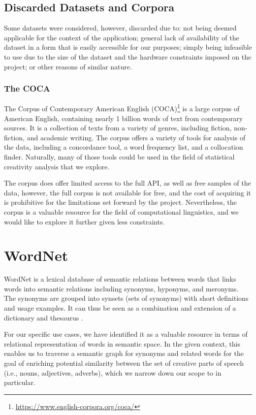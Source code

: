 
\subsection{Discarded Datasets and Corpora}
Some datasets were considered, however, discarded due to: not being deemed applicable for the context of the application; general lack of availability of the dataset in a form that is easily accessible for our purposes; simply being infeasible to use due to the size of the dataset and the hardware constraints imposed on the project; or other reasons of similar nature.

\subsubsection*{The COCA}
The Corpus of Contemporary American English (COCA)\footnote[2]{\url{https://www.english-corpora.org/coca/}} is a large corpus of American English, containing nearly 1 billion words of text from contemporary sources. It is a collection of texts from a variety of genres, including fiction, non-fiction, and academic writing. The corpus offers a variety of tools for analysis of the data, including a concordance tool, a word frequency list, and a collocation finder. Naturally, many of those tools could be used in the field of statistical creativity analysis that we explore.

The corpus does offer limited access to the full API, as well as free samples of the data, however, the full corpus is not available for free, and the cost of acquiring it is prohibitive for the limitations set forward by the project. Nevertheless, the corpus is a valuable resource for the field of computational linguistics, and we would like to explore it further given less constraints.
\section{WordNet}
WordNet\citep{wordnet1998fellbaum} is a lexical database of semantic relations between words that links words into semantic relations including synonyms, hyponyms, and meronyms. The synonyms are grouped into synsets (sets of synonyms) with short definitions and usage examples. It can thus be seen as a combination and extension of a dictionary and thesaurus \citep{enwiki:1143619785}. 

For our specific use cases, we have identified it as a valuable resource in terms of relational representation of words in semantic space. In the given context, this enables us to traverse a semantic graph for synonyms and related words for the goal of enriching potential similarity between the set of creative parts of speech (i.e., nouns, adjectives, adverbs), which we narrow down our scope to in particular. 
